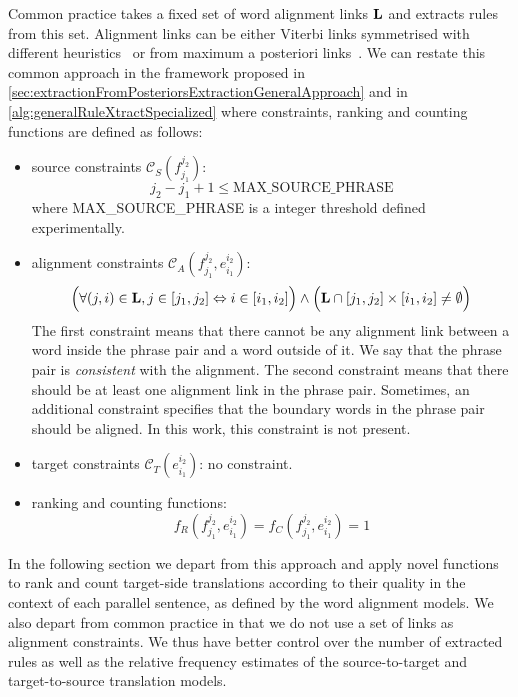 Common practice takes a fixed set of word alignment links ${\bf L}$ and extracts
rules from this set. Alignment links can be either Viterbi links symmetrised
with different heuristics~\citep{koehn-och-marcu:2003:NAACL} or from maximum a
posteriori links~\citep{kumar-och-macherey:2007:EMNLP}. We can restate this
common approach in the framework proposed in
\autoref{sec:extractionFromPosteriorsExtractionGeneralApproach} and in
\autoref{alg:generalRuleXtractSpecialized} where constraints, ranking and
counting functions are defined as follows:
%
\begin{itemize}
  \item source constraints $\mathcal{C}_S(f_{j_1}^{j_2})$:
%
\begin{equation}
  j_2 - j_1 + 1 \leq \mbox{MAX\_SOURCE\_PHRASE}
\end{equation}
%
where MAX\_SOURCE\_PHRASE is a integer threshold defined experimentally.
  \item alignment constraints $\mathcal{C}_A(f_{j_1}^{j_2}, e_{i_1}^{i_2})$:
%
\begin{equation}
  \Big( \forall (j,i) \in {\bf L}, j \in [j_1, j_2] \Leftrightarrow i \in [i_1,i_2] \Big) \land \Big( {\bf L} \cap [j_1, j_2] \times [i_1, i_2] \neq \emptyset \Big)
\end{equation}
%
The first constraint means that there cannot be any alignment link between a
word inside the phrase pair and a word outside of it. We say that the phrase
pair is \emph{consistent} with the alignment. The second constraint means that
there should be at least one alignment link in the phrase pair. Sometimes, an
additional constraint specifies that the boundary words in the phrase pair
should be aligned. In this work, this constraint is not present.
  \item target constraints $\mathcal{C}_T(e_{i_1}^{i_2})$: no constraint.
  \item ranking and counting functions:
%
\begin{equation}
  f_R(f_{j_1}^{j_2},e_{i_1}^{i_2}) = f_C(f_{j_1}^{j_2},e_{i_1}^{i_2}) = 1
\end{equation}
\end{itemize}
%
In the following section we depart from this approach and apply novel functions
to rank and count target-side translations according to their quality in the
context of each parallel sentence, as defined by the word alignment models. We
also depart from common practice in that we do not use a set of links as
alignment constraints. We thus have better control over the number of extracted
rules as well as the relative frequency estimates of the source-to-target and
target-to-source translation models.

